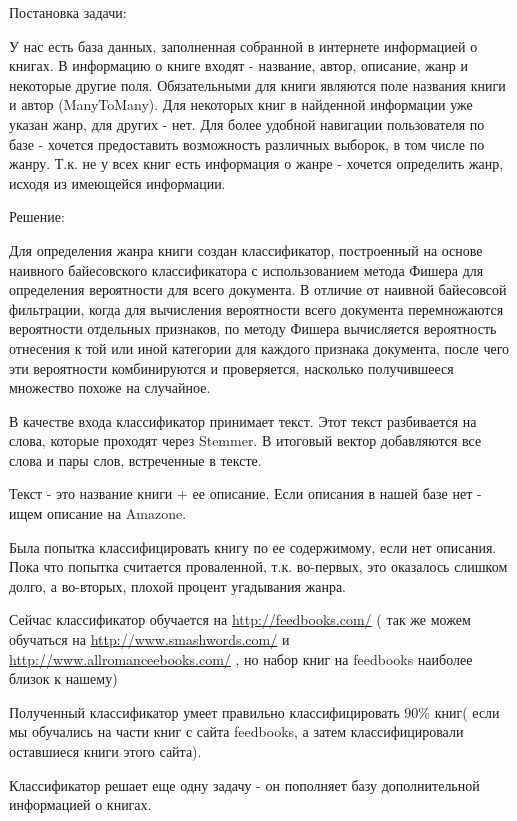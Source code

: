 \documentclass[a4paper]{report}
\begin{document}
Постановка задачи:

У нас есть база данных, заполненная собранной в интернете информацией о книгах. В информацию о книге входят - название, автор, описание, жанр и некоторые другие поля. Обязательными для книги являются поле названия книги и автор (ManyToMany). Для некоторых книг в найденной информации уже указан жанр, для других - нет. Для более удобной навигации пользователя по базе - хочется предоставить возможность различных выборок, в том числе по жанру. Т.к. не у всех книг есть информация о жанре - хочется определить жанр, исходя из имеющейся информации. 

Решение:

Для определения жанра книги создан классификатор, построенный на основе наивного байесовского классификатора с использованием метода Фишера для определения вероятности для всего документа. В отличие от наивной байесовсой фильтрации, когда для вычисления вероятности всего документа перемножаются вероятности отдельных признаков, по методу Фишера вычисляется вероятность отнесения к той или иной категории для каждого признака документа, после чего эти вероятности комбинируются и проверяется, насколько получившееся множество похоже на случайное.

В качестве входа классификатор принимает текст. Этот текст разбивается на слова, которые проходят через Stemmer. В итоговый вектор добавляются все слова и пары слов, встреченные в тексте.

Текст - это название книги + ее описание. Если описания в нашей базе нет - ищем описание на Amazone.

Была попытка классифицировать книгу по ее содержимому, если нет описания. Пока что попытка считается проваленной, т.к. во-первых, это оказалось слишком долго, а во-вторых, плохой процент угадывания жанра.

Сейчас классификатор обучается на \url{http://feedbooks.com/} ( так же можем обучаться на \url{http://www.smashwords.com/} и \url{http://www.allromanceebooks.com/} , но набор книг на feedbooks наиболее близок к нашему)

Полученный классификатор умеет правильно классифицировать 90\% книг( если мы обучались на части книг с сайта feedbooks, а затем классифицировали оставшиеся книги этого сайта). 


Классификатор решает еще одну задачу - он пополняет базу дополнительной информацией о книгах.

\end{document}
